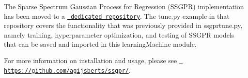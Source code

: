 The Sparse Spectrum Gaussian Process for Regression (S\+S\+G\+PR) implementation has been moved to a \href{https://github.com/agijsberts/ssgpr/}{\texttt{ dedicated repository}}. The {\ttfamily tune.\+py} example in that repository covers the functionality that was previously provided in {\ttfamily ssgprtune.\+py}, namely training, hyperparameter optimization, and testing of S\+S\+G\+PR models that can be saved and imported in this {\ttfamily learning\+Machine} module.

For more information on installation and usage, please see \href{https://github.com/agijsberts/ssgpr/}{\texttt{ https\+://github.\+com/agijsberts/ssgpr/}}. 